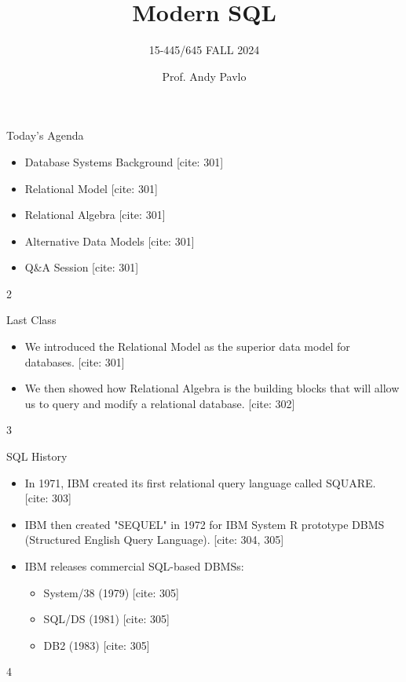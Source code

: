 \documentclass{beamer}
\title{Modern SQL}
\subtitle{15-445/645 FALL 2024}
\author{Prof. Andy Pavlo}
\institute{Carnegie Mellon University}
\date{}
\begin{document}
\frame{\titlepage}

\begin{frame}{Today's Agenda}
    \begin{itemize}
        \item Database Systems Background [cite: 301]
        \item Relational Model [cite: 301]
        \item Relational Algebra [cite: 301]
        \item Alternative Data Models [cite: 301]
        \item Q\&A Session [cite: 301]
    \end{itemize}
    \vfill
    \hfill 2
\end{frame}

\begin{frame}{Last Class}
    \begin{itemize}
        \item We introduced the Relational Model as the superior data model for databases. [cite: 301]
        \item We then showed how Relational Algebra is the building blocks that will allow us to query and modify a relational database. [cite: 302]
    \end{itemize}
    \vfill
    \hfill 3
\end{frame}

\begin{frame}{SQL History}
    \begin{itemize}
        \item In 1971, IBM created its first relational query language called SQUARE. [cite: 303]
        \item IBM then created "SEQUEL" in 1972 for IBM System R prototype DBMS (Structured English Query Language). [cite: 304, 305]
        \item IBM releases commercial SQL-based DBMSs:
        \begin{itemize}
            \item System/38 (1979) [cite: 305]
            \item SQL/DS (1981) [cite: 305]
            \item DB2 (1983) [cite: 305]
        \end{itemize}
    \end{itemize}
    \vfill
    \hfill 4
\end{frame}
\end{document}
